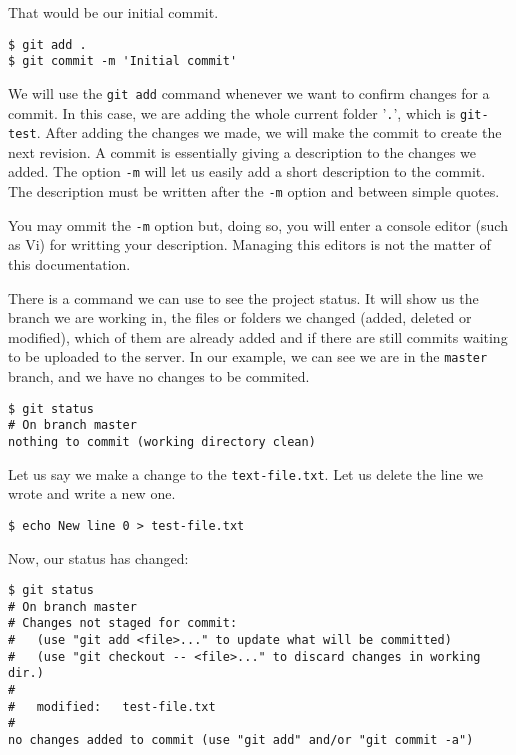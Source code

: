 \documentclass[a4paper,10pt]{article}
\newenvironment{terminal}
  {
    \vspace{+10pt}
    \begin{center}
    \begin{minipage}{0.95\textwidth}
    \begin{framed}
  }
  {
    \end{framed}
    \end{minipage}
    \end{center}
    \vspace{+10pt}
  }
\begin{document}
That would be our initial commit.

\begin{terminal}
\begin{verbatim}
$ git add .
$ git commit -m 'Initial commit'
\end{verbatim}
\end{terminal}

We will use the \texttt{git add} command whenever we want to confirm
changes for a commit. In this case, we are adding the whole current
folder '\texttt{.}', which is \texttt{git-test}. After adding the
changes we made, we will make the commit to create the next revision.
A commit is essentially giving a description to the changes we added.
The option \texttt{-m} will let us easily add a short description to
the commit. The description must be written after the \texttt{-m} option
and between simple quotes.

\begin{tip}
You may ommit the \texttt{-m} option but, doing so, you will enter a
console editor (such as Vi) for writting your description. Managing this
editors is not the matter of this documentation.
\end{tip}

There is a command we can use to see the project status. It will show
us the branch we are working in, the files or folders we changed
(added, deleted or modified), which of them are already added and if
there are still commits waiting to be uploaded to the server. In our
example, we can see we are in the \texttt{master} branch, and we have
no changes to be commited.

\begin{terminal}
\begin{verbatim}
$ git status
# On branch master
nothing to commit (working directory clean)
\end{verbatim}
\end{terminal}

Let us say we make a change to the \texttt{text-file.txt}. Let us delete the
line we wrote and write a new one.

\begin{terminal}
\begin{verbatim}
$ echo New line 0 > test-file.txt
\end{verbatim}
\end{terminal}

Now, our status has changed:

\begin{terminal}
\begin{verbatim}
$ git status
# On branch master
# Changes not staged for commit:
#   (use "git add <file>..." to update what will be committed)
#   (use "git checkout -- <file>..." to discard changes in working dir.)
#
#	modified:   test-file.txt
#
no changes added to commit (use "git add" and/or "git commit -a")
\end{verbatim}
\end{terminal}
\end{document}
